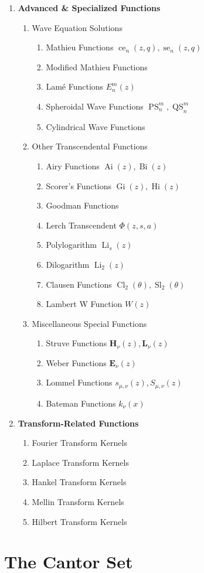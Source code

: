 \begin{enumerate}[label=\textbf{\arabic*.}]
	\item \textbf{Advanced \& Specialized Functions}
	\begin{enumerate}[label=\textbf{\alph*)}]
		\item Wave Equation Solutions
		\begin{enumerate}[label=\textbf{\roman*)}]
			\item Mathieu Functions $\operatorname{ce}_n(z,q), \operatorname{se}_n(z,q)$
			\item Modified Mathieu Functions
			\item Lamé Functions $E_n^m(z)$
			\item Spheroidal Wave Functions $\operatorname{PS}_n^m, \operatorname{QS}_n^m$
			\item Cylindrical Wave Functions
		\end{enumerate}
		\item Other Transcendental Functions
		\begin{enumerate}[label=\textbf{\roman*)}]
			\item Airy Functions $\operatorname{Ai}(z), \operatorname{Bi}(z)$
			\item Scorer's Functions $\operatorname{Gi}(z), \operatorname{Hi}(z)$
			\item Goodman Functions
			\item Lerch Transcendent $\Phi(z,s,a)$
			\item Polylogarithm $\operatorname{Li}_s(z)$
			\item Dilogarithm $\operatorname{Li}_2(z)$
			\item Clausen Functions $\operatorname{Cl}_2(\theta), \operatorname{Sl}_2(\theta)$
			\item Lambert W Function $W(z)$
		\end{enumerate}
		\item Miscellaneous Special Functions
		\begin{enumerate}[label=\textbf{\roman*)}]
			\item Struve Functions $\mathbf{H}_\nu(z), \mathbf{L}_\nu(z)$
			\item Weber Functions $\mathbf{E}_\nu(z)$
			\item Lommel Functions $s_{\mu,\nu}(z), S_{\mu,\nu}(z)$
			\item Bateman Functions $k_\nu(x)$
		\end{enumerate}
	\end{enumerate}
	
	\item \textbf{Transform-Related Functions}
	\begin{enumerate}[label=\textbf{\alph*)}]
		\item Fourier Transform Kernels
		\item Laplace Transform Kernels
		\item Hankel Transform Kernels
		\item Mellin Transform Kernels
		\item Hilbert Transform Kernels
	\end{enumerate}
\end{enumerate}
\section{The Cantor Set}